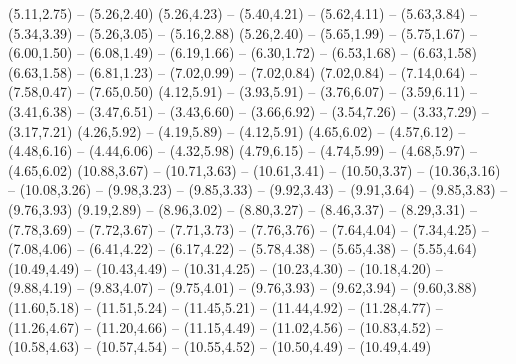 \expandafter\def\csname geo:fluss:RioGrande\endcsname{
  (5.11,2.75) -- (5.26,2.40)
  (5.26,4.23) -- (5.40,4.21) -- (5.62,4.11) -- (5.63,3.84) -- (5.34,3.39) -- (5.26,3.05) -- (5.16,2.88)
  (5.26,2.40) -- (5.65,1.99) -- (5.75,1.67) -- (6.00,1.50) -- (6.08,1.49) -- (6.19,1.66) -- (6.30,1.72) -- (6.53,1.68) -- (6.63,1.58)
  (6.63,1.58) -- (6.81,1.23) -- (7.02,0.99) -- (7.02,0.84)
  (7.02,0.84) -- (7.14,0.64) -- (7.58,0.47) -- (7.65,0.50)}
\expandafter\def\csname geo:fluss:Snake\endcsname{
  (4.12,5.91) -- (3.93,5.91) -- (3.76,6.07) -- (3.59,6.11) -- (3.41,6.38) -- (3.47,6.51) -- (3.43,6.60) -- (3.66,6.92) -- (3.54,7.26) -- (3.33,7.29) -- (3.17,7.21)
  (4.26,5.92) -- (4.19,5.89) -- (4.12,5.91)
  (4.65,6.02) -- (4.57,6.12) -- (4.48,6.16) -- (4.44,6.06) -- (4.32,5.98)
  (4.79,6.15) -- (4.74,5.99) -- (4.68,5.97) -- (4.65,6.02)}
\expandafter\def\csname geo:fluss:Tennessee\endcsname{
  (10.88,3.67) -- (10.71,3.63) -- (10.61,3.41) -- (10.50,3.37) -- (10.36,3.16) -- (10.08,3.26) -- (9.98,3.23) -- (9.85,3.33) -- (9.92,3.43) -- (9.91,3.64) -- (9.85,3.83) -- (9.76,3.93)}
\expandafter\def\csname geo:fluss:Arkansas\endcsname{
  (9.19,2.89) -- (8.96,3.02) -- (8.80,3.27) -- (8.46,3.37) -- (8.29,3.31) -- (7.78,3.69) -- (7.72,3.67) -- (7.71,3.73) -- (7.76,3.76) -- (7.64,4.04) -- (7.34,4.25) -- (7.08,4.06) -- (6.41,4.22) -- (6.17,4.22) -- (5.78,4.38) -- (5.65,4.38) -- (5.55,4.64)}
\expandafter\def\csname geo:fluss:Ohio\endcsname{
  (10.49,4.49) -- (10.43,4.49) -- (10.31,4.25) -- (10.23,4.30) -- (10.18,4.20) -- (9.88,4.19) -- (9.83,4.07) -- (9.75,4.01) -- (9.76,3.93) -- (9.62,3.94) -- (9.60,3.88)
  (11.60,5.18) -- (11.51,5.24) -- (11.45,5.21) -- (11.44,4.92) -- (11.28,4.77) -- (11.26,4.67) -- (11.20,4.66) -- (11.15,4.49) -- (11.02,4.56) -- (10.83,4.52) -- (10.58,4.63) -- (10.57,4.54) -- (10.55,4.52) -- (10.50,4.49) -- (10.49,4.49)}

